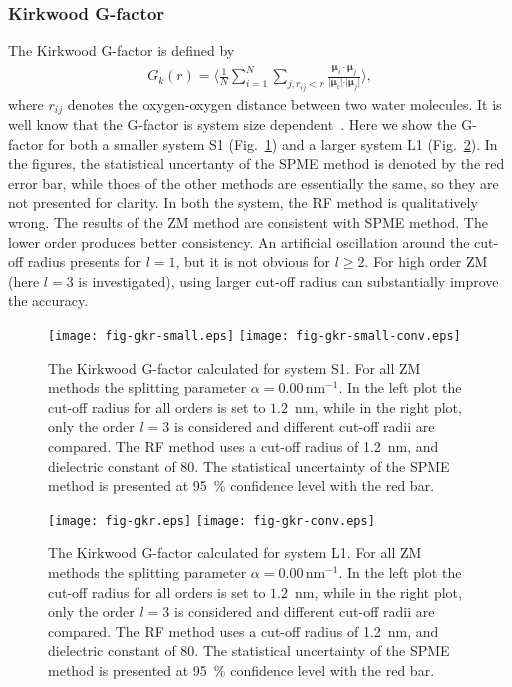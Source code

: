 \documentclass[a4paper,reprint,unsortedaddress,onecolumn]{revtex4-1}
\begin{document}
\subsubsection{Kirkwood G-factor}

The Kirkwood G-factor is defined by~\cite{vanderSpoel2006origin}
\begin{align}
  G_k(r) =
  \Big\langle
  \frac 1N
  \sum_{i=1}^N \sum_{j, r_{ij} < r}
  \frac {\boldsymbol\mu_i \cdot \boldsymbol\mu_j}{\vert \boldsymbol\mu_i\vert \cdot \vert\boldsymbol\mu_j\vert}
  \Big\rangle,
\end{align}
where $r_{ij}$ denotes the oxygen-oxygen distance between two water
molecules.  It is well know that the G-factor is system size
dependent~\cite{vanderSpoel2006origin}. Here we show the G-factor for
both a smaller system S1 (Fig.~\ref{fig:tmp1}) and a larger system L1
(Fig.~\ref{fig:tmp2}).  In the figures, the statistical uncertanty of
the SPME method is denoted by the red error bar, while thoes of the
other methods are essentially the same, so they are not presented for
clarity.  In both the system, the RF method is qualitatively
wrong. The results of the ZM method are consistent with SPME
method. The lower order produces better consistency.  An artificial
oscillation around the cut-off radius presents for $l=1$, but it is
not obvious for $l\geq 2$.  For high order ZM (here $l=3$ is investigated),
using larger cut-off radius can substantially improve the accuracy.

\begin{figure}
  \centering
  \texttt{[image: fig-gkr-small.eps]}
  \texttt{[image: fig-gkr-small-conv.eps]}
  \caption{The Kirkwood G-factor calculated for system S1.
    For all ZM methods the splitting parameter $\alpha = 0.00\,\textrm{nm}^{-1}$.
    In the left plot the cut-off radius for all orders is set to $1.2$~nm, while
    in the right plot, only the order $l=3$ is considered and different cut-off radii are compared.
    The RF method uses a cut-off radius of 1.2~nm, and dielectric constant of 80.
    The statistical uncertainty of the SPME method is presented at 95~\% confidence level with the red bar.
  }
  \label{fig:tmp1}
\end{figure}

\begin{figure}
  \centering
  \texttt{[image: fig-gkr.eps]}
  \texttt{[image: fig-gkr-conv.eps]}
  \caption{The Kirkwood G-factor calculated for system L1.
    For all ZM methods the splitting parameter $\alpha = 0.00\,\textrm{nm}^{-1}$.
    In the left plot the cut-off radius for all orders is set to $1.2$~nm, while
    in the right plot, only the order $l=3$ is considered and different cut-off radii are compared.
    The RF method uses a cut-off radius of 1.2~nm, and dielectric constant of 80.
    The statistical uncertainty of the SPME method is presented at 95~\% confidence level with the red bar.
  }
  \label{fig:tmp2}
\end{figure}





\newpage
{}

\end{document}
